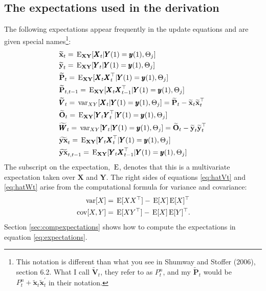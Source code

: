 \documentclass[]{article}
\def\OO{\mbox{$\mathbf O$}}
\def\PP{\mbox{$\mathbf P$}}  \def\pp{\mbox{$\mathbf p$}}
\def\VV{\mbox{$\pmb{V}$}}	\def\vv{\mbox{$\pmb{v}$}}
\def\WW{\mbox{$\pmb{W}$}}	\def\ww{\mbox{$\pmb{w}$}}
\def\XX{\mbox{$\pmb{X}$}}	\def\xx{\mbox{$\pmb{x}$}}
\def\YY{\mbox{$\pmb{Y}$}}	\def\yy{\mbox{$\pmb{y}$}}
\def\E{\,\textup{\textrm{E}}}
\def\var{\,\textup{\textrm{var}}}
\def\cov{\,\textup{\textrm{cov}}}
\def\EXy{\,\textup{\textrm{E}}_{\text{{\bf XY}}}}
\def\hatxt{\widetilde{\mbox{$\mathbf x$}}_t}
\def\hatyt{\widetilde{\mbox{$\mathbf y$}}_t}
\def\hatOt{\widetilde{\OO}_t}
\def\hatWt{\widetilde{\WW}_t}
\def\hatYXt{\widetilde{\mbox{$\mathbf{y}\mathbf{x}$}}_t}
\def\hatYXttm{\widetilde{\mbox{$\mathbf{y}\mathbf{x}$}}_{t,t-1}}
\def\hatPt{\widetilde{\PP}_t}
\def\hatPttm{\widetilde{\PP}_{t,t-1}}
\def\hatVt{\widetilde{\VV}_t}
\begin{document}
\subsection{The expectations used in the derivation}\label{sec:expectations}
The following expectations appear frequently in the update equations and are given special names\footnote{This notation is different than what you see in Shumway and Stoffer (2006), section 6.2.  What I call $\hatVt$, they refer to as $P_t^n$, and my $\hatPt$ would be $P_t^n + \hatxt \hatxt^\prime$ in their notation.}:
\begin{subequations}\label{eq:expectations}
\begin{align}
&\hatxt = \EXy[\XX_t | \YY(1)=\yy(1), \Theta_j]\\
&\hatyt = \EXy[\YY_t | \YY(1)=\yy(1), \Theta_j]\\
&\hatPt=\EXy[\XX_t\XX_t^\top | \YY(1)=\yy(1), \Theta_j]\\
&\hatPttm=\EXy[\XX_{t}\XX_{t-1}^\top | \YY(1)=\yy(1), \Theta_j]\\
&\hatVt = \var_{XY}[\XX_t|\YY(1)=\yy(1), \Theta_j] = \hatPt-\hatxt\hatxt^\top\label{eq:hatVt}\\
&\hatOt=\EXy[\YY_t\YY_t^\top | \YY(1)=\yy(1), \Theta_j]\\
&\hatWt = \var_{XY}[\YY_t|\YY(1)=\yy(1), \Theta_j] = \hatOt-\hatyt\hatyt^\top\label{eq:hatWt}\\
&\hatYXt = \EXy[\YY_t\XX_t^\top| \YY(1)=\yy(1), \Theta_j]\\
&\hatYXttm = \EXy[\YY_t\XX_{t-1}^\top| \YY(1)=\yy(1), \Theta_j]
\end{align}
\end{subequations}
The subscript on the expectation, $\E$, denotes that this is a multivariate expectation taken over $\XX$ and $\YY$.  The right sides of equations \ref{eq:hatVt} and \ref{eq:hatWt} arise from the computational formula for variance and covariance: 
\begin{align}\label{eq:comp.formula.variance}
\var[X] &= \E[XX^\top] - \E[X]\E[X]^\top\\
\cov[X,Y] &= \E[XY^\top] - \E[X]\E[Y]^\top.	
\end{align}
Section \ref{sec:compexpectations} shows how to compute the expectations in equation \ref{eq:expectations}.
\end{document}
